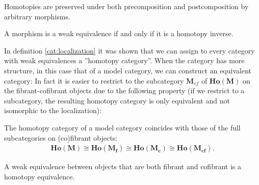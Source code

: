     \begin{property}
        Homotopies are preserved under both precomposition and postcomposition by arbitrary morphisms.
    \end{property}
    \begin{property}
        A morphism is a weak equivalence if and only if it is a homotopy inverse.
    \end{property}


    In definition \ref{cat:localization} it was shown that we can assign to every category with weak equivalences a ''homotopy category''. When the category has more structure, in this case that of a model category, we can construct an equivalent category:
    In fact it is easier to restrict to the subcategory $\mathbf{M}_{cf}$ of $\mathbf{Ho(M)}$ on the fibrant-cofibrant objects due to the following property (if we restrict to a subcategory, the resulting homotopy category is only equivalent and not isomorphic to the localization):
    \begin{property}
        The homotopy category of a model category coincides with those of the full subcategories on (co)fibrant objects:
        \begin{gather}
            \mathbf{Ho(M)}\cong\mathbf{Ho(M_f)}\cong\mathbf{Ho(M_c)}\cong\mathbf{Ho(M_{cf})}.
        \end{gather}
    \end{property}

    \begin{theorem}[Whitehead]
        A weak equivalence between objects that are both fibrant and cofibrant is a homotopy equivalence.
    \end{theorem}

